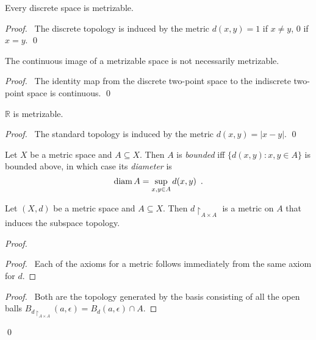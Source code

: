 \begin{lm}
  Every discrete space is metrizable.
\end{lm}

\begin{proof}
  \pf\ The discrete topology is induced by the metric $d(x, y) = 1$ if $x
  \neq
  y$, 0 if $x = y$. \qed
\end{proof}

\begin{prop}
  The continuous image of a metrizable space is not necessarily metrizable.
\end{prop}

\begin{proof}
  \pf\ The identity map from the discrete two-point space to the indiscrete two-point space is continuous. \qed
\end{proof}

\begin{lm}
  $\mathbb{R}$ is metrizable.
\end{lm}

\begin{proof}
  \pf\ The standard topology is induced by the metric $d(x, y) = |x-y|$. \qed
\end{proof}

\begin{df}[Bounded]
  Let $X$ be a metric space and $A \subseteq X$. Then $A$ is \emph{bounded}
  iff $\{ d(x, y) : x, y \in A \}$ is bounded above, in which case its
  \emph{diameter} is
  \[ \operatorname{diam} A = \sup_{x, y \in A} d(x, y) \enspace . \]
\end{df}

\begin{lm}
  \label{lm:topology:metric:subspace}
  Let $(X, d)$ be a metric space and $A \subseteq X$. Then $d \restriction_{A
  \times A}$ is a metric on $A$ that induces the subspace topology.
\end{lm}

\begin{proof}
  \pf
  \begin{proof}
    \pf\ Each of the axioms for a metric follows immediately from the same
    axiom for $d$.
  \end{proof}
  \begin{proof}
    \pf\ Both are the topology generated by the basis consisting of all
    the open balls $B_{d \restriction_{A \times A}}(a, \epsilon) = B_d(a,
    \epsilon)  \cap      A$.
  \end{proof}
  \qed
\end{proof}

